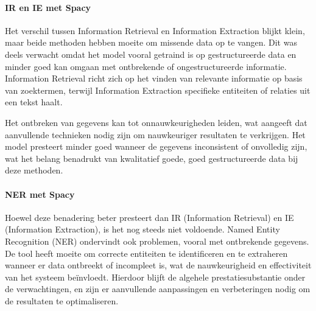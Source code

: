 %

\paragraph{IR en IE met Spacy}
Het verschil tussen Information Retrieval en Information Extraction blijkt klein, maar beide methoden hebben moeite om missende data op te vangen. Dit was deels verwacht omdat het model vooral getraind is op gestructureerde data en minder goed kan omgaan met ontbrekende of ongestructureerde informatie. Information Retrieval richt zich op het vinden van relevante informatie op basis van zoektermen, terwijl Information Extraction specifieke entiteiten of relaties uit een tekst haalt. 

Het ontbreken van gegevens kan tot onnauwkeurigheden leiden, wat aangeeft dat aanvullende technieken nodig zijn om nauwkeuriger resultaten te verkrijgen. Het model presteert minder goed wanneer de gegevens inconsistent of onvolledig zijn, wat het belang benadrukt van kwalitatief goede, goed gestructureerde data bij deze methoden. 


\paragraph{NER met Spacy}
Hoewel deze benadering beter presteert dan IR (Information Retrieval) en IE (Information Extraction), is het nog steeds niet voldoende. Named Entity Recognition (NER) ondervindt ook problemen, vooral met ontbrekende gegevens. De tool heeft moeite om correcte entiteiten te identificeren en te extraheren wanneer er data ontbreekt of incompleet is, wat de nauwkeurigheid en effectiviteit van het systeem beïnvloedt. Hierdoor blijft de algehele prestatiesubstantie onder de verwachtingen, en zijn er aanvullende aanpassingen en verbeteringen nodig om de resultaten te optimaliseren.
